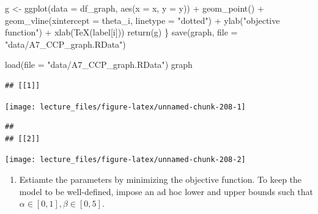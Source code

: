 \documentclass[
]{book}
\newenvironment{Shaded}{\begin{snugshade}}{\end{snugshade}}
\newcommand{\AttributeTok}[1]{\textcolor[rgb]{0.77,0.63,0.00}{#1}}
\newcommand{\FunctionTok}[1]{\textcolor[rgb]{0.00,0.00,0.00}{#1}}
\newcommand{\NormalTok}[1]{#1}
\newcommand{\OtherTok}[1]{\textcolor[rgb]{0.56,0.35,0.01}{#1}}
\newcommand{\SpecialCharTok}[1]{\textcolor[rgb]{0.00,0.00,0.00}{#1}}
\newcommand{\StringTok}[1]{\textcolor[rgb]{0.31,0.60,0.02}{#1}}
\providecommand{\tightlist}{%
  \setlength{\itemsep}{0pt}\setlength{\parskip}{0pt}}
\begin{document}
\begin{Shaded}
\begin{Highlighting}[]
\NormalTok{  g }\OtherTok{\textless{}{-}} \FunctionTok{ggplot}\NormalTok{(}\AttributeTok{data =}\NormalTok{ df\_graph, }\FunctionTok{aes}\NormalTok{(}\AttributeTok{x =}\NormalTok{ x, }\AttributeTok{y =}\NormalTok{ y)) }\SpecialCharTok{+} 
    \FunctionTok{geom\_point}\NormalTok{() }\SpecialCharTok{+}
    \FunctionTok{geom\_vline}\NormalTok{(}\AttributeTok{xintercept =}\NormalTok{ theta\_i, }\AttributeTok{linetype =} \StringTok{"dotted"}\NormalTok{) }\SpecialCharTok{+}
    \FunctionTok{ylab}\NormalTok{(}\StringTok{"objective function"}\NormalTok{) }\SpecialCharTok{+} \FunctionTok{xlab}\NormalTok{(}\FunctionTok{TeX}\NormalTok{(label[i]))}
  \FunctionTok{return}\NormalTok{(g)}
\NormalTok{\}}
\FunctionTok{save}\NormalTok{(graph, }\AttributeTok{file =} \StringTok{"data/A7\_CCP\_graph.RData"}\NormalTok{)}
\end{Highlighting}
\end{Shaded}

\begin{Shaded}
\begin{Highlighting}[]
\FunctionTok{load}\NormalTok{(}\AttributeTok{file =} \StringTok{"data/A7\_CCP\_graph.RData"}\NormalTok{)}
\NormalTok{graph}
\end{Highlighting}
\end{Shaded}

\begin{verbatim}
## [[1]]
\end{verbatim}

\begin{center}\texttt{[image: lecture\_files/figure-latex/unnamed-chunk-208-1]} \end{center}

\begin{verbatim}
## 
## [[2]]
\end{verbatim}

\begin{center}\texttt{[image: lecture\_files/figure-latex/unnamed-chunk-208-2]} \end{center}

\begin{enumerate}
\def\labelenumi{\arabic{enumi}.}
\setcounter{enumi}{3}
\tightlist
\item
  Estiamte the parameters by minimizing the objective function. To keep the model to be well-defined, impose an ad hoc lower and upper bounds such that \(\alpha \in [0, 1], \beta \in [0, 5]\).
\end{enumerate}
\end{document}
